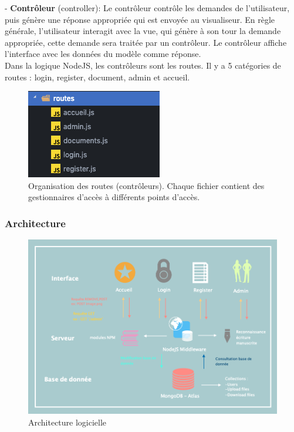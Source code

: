 \documentclass[oneside,a4paper,13pt]{article}
\begin{document}
- \textbf{Contrôleur} (controller): Le contrôleur contrôle les demandes de l'utilisateur, puis génère une réponse appropriée qui est envoyée au visualiseur. En règle générale, l'utilisateur interagit avec la vue, qui génère à son tour la demande appropriée, cette demande sera traitée par un contrôleur. Le contrôleur affiche l'interface avec les données du modèle comme réponse. \\
Dans la logique NodeJS, les contrôleurs sont les routes. Il y a 5 catégories de routes : login, register, document, admin et accueil. \\

\begin{figure}[H]
    \centering
        \includegraphics[width=0.3\linewidth]{Backend/Database/routes.png}
        \caption{Organisation des routes (contrôleurs). Chaque fichier contient des gestionnaires d'accès à différents points d'accès.}
        \label{fig:my_label}
\end{figure}

\subsubsection{Architecture}

\begin{figure}[H]
    \centering
        \includegraphics[width=0.8\linewidth]{Backend/Database/Archi.png}
        \caption{Architecture logicielle}
        \label{fig:my_label}
\end{figure}
\end{document}
